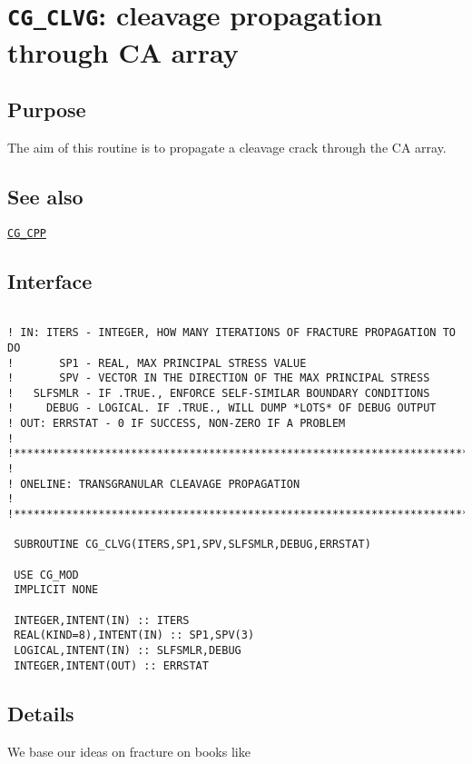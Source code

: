 \section{\texttt{CG\_CLVG}: cleavage propagation
through CA array}

\label{sec:cg_clvg}

\subsection{Purpose}

The aim of this routine is to propagate a cleavage
crack through the CA array.

\subsection{See also}

\hyperref[sec:cg_cpp]{\texttt{CG\_CPP}} 

\subsection{Interface}

\begin{verbatim}

! IN: ITERS - INTEGER, HOW MANY ITERATIONS OF FRACTURE PROPAGATION TO DO
!       SP1 - REAL, MAX PRINCIPAL STRESS VALUE
!       SPV - VECTOR IN THE DIRECTION OF THE MAX PRINCIPAL STRESS
!   SLFSMLR - IF .TRUE., ENFORCE SELF-SIMILAR BOUNDARY CONDITIONS
!     DEBUG - LOGICAL. IF .TRUE., WILL DUMP *LOTS* OF DEBUG OUTPUT
! OUT: ERRSTAT - 0 IF SUCCESS, NON-ZERO IF A PROBLEM
!  
!**********************************************************************73
!  
! ONELINE: TRANSGRANULAR CLEAVAGE PROPAGATION
!     
!**********************************************************************73
 
 SUBROUTINE CG_CLVG(ITERS,SP1,SPV,SLFSMLR,DEBUG,ERRSTAT)

 USE CG_MOD
 IMPLICIT NONE

 INTEGER,INTENT(IN) :: ITERS
 REAL(KIND=8),INTENT(IN) :: SP1,SPV(3)
 LOGICAL,INTENT(IN) :: SLFSMLR,DEBUG
 INTEGER,INTENT(OUT) :: ERRSTAT

\end{verbatim}

\subsection{Details}

We base our ideas on fracture on books like \cite{averbach1959}

